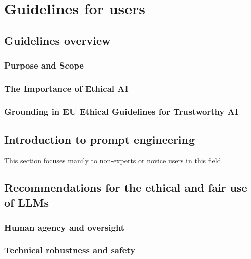 \setcounter{figure}{0}
\setcounter{table}{0}
\setcounter{section}{0}
\setcounter{listing}{0}

\chapter{Guidelines for users \label{cha:guidelines}}
\renewcommand{\thepage}{B-\arabic{page}}


\begin{refsegment}
\minitoc
\newpage

\section{Guidelines overview}
    \subsection*{Purpose and Scope}
    \subsection*{The Importance of Ethical AI}
    \subsection*{Grounding in EU Ethical Guidelines for Trustworthy AI}

\section{Introduction to prompt engineering}
This section focuses manily to non-experts or novice users in this field.

\section{Recommendations for the ethical and fair use of LLMs}

    \subsection*{Human agency and oversight}
    \subsection*{Technical robustness and safety}

\end{refsegment}
